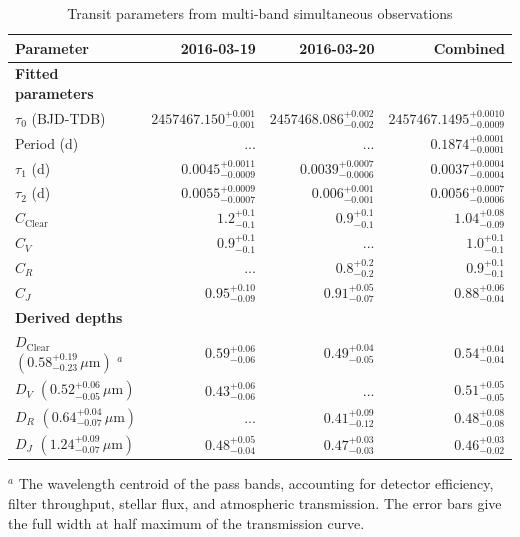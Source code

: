 \documentclass[useAMS,usenatbib]{mn2e}
\begin{document}
\begin{table}
\centering
\caption{\label{tab:simultaneous_params}Transit parameters from multi-band simultaneous observations}
\begin{tabular}{lrrr}
\hline\hline
Parameter & 2016-03-19 & 2016-03-20 & Combined\\
\hline
\textbf{Fitted parameters} & & & \\
$\tau_0$ (BJD-TDB) & $2457467.150_{-0.001}^{+0.001}$ & $2457468.086_{-0.002}^{+0.002}$ & $2457467.1495_{-0.0009}^{+0.0010}$\\
Period (d) & ... & ... & $0.1874_{-0.0001}^{+0.0001}$ \\ 
$\tau_1$ (d) & $0.0045_{-0.0009}^{+0.0011}$ & $0.0039_{-0.0006}^{+0.0007}$ & $0.0037_{-0.0004}^{+0.0004}$ \\
$\tau_2$ (d) & $0.0055_{-0.0007}^{+0.0009}$ & $0.006_{-0.001}^{+0.001}$ & $0.0056_{-0.0006}^{+0.0007}$ \\
$C_\mathrm{Clear}$ & $1.2_{-0.1}^{+0.1}$ & $0.9_{-0.1}^{+0.1}$ & $1.04_{-0.09}^{+0.08}$ \\
$C_V$ & $0.9_{-0.1}^{+0.1}$ & ... & $1.0_{-0.1}^{+0.1}$\\
$C_R$ & ... & $0.8_{-0.2}^{+0.2}$ & $0.9_{-0.1}^{+0.1}$ \\
$C_J$ & $0.95_{-0.09}^{+0.10}$ & $0.91_{-0.07}^{+0.05}$ & $0.88_{-0.04}^{+0.06}$ \\
\textbf{Derived depths} && \\
$D_\mathrm{Clear}$ $(0.58_{-0.23}^{+0.19}\,\mu\mathrm{m})$ $^a$ & $0.59_{-0.06}^{+0.06}$ & $0.49_{-0.05}^{+0.04}$ & $0.54_{-0.04}^{+0.04}$ \\
$D_V$ $(0.52_{-0.05}^{+0.06}\,\mu\mathrm{m})$& $0.43_{-0.06}^{+0.06}$  & ... & $0.51_{-0.05}^{+0.05}$\\
$D_R$ $(0.64_{-0.07}^{+0.04}\,\mu\mathrm{m})$& ... & $0.41_{-0.12}^{+0.09}$ & $0.48_{-0.08}^{+0.08}$\\
$D_J$ $(1.24_{-0.07}^{+0.09}\,\mu\mathrm{m})$ & $0.48_{-0.04}^{+0.05}$ & $0.47_{-0.03}^{+0.03}$ & $0.46_{-0.02}^{+0.03}$\\
\hline
\end{tabular}
    \begin{flushleft}
    $^a$ The wavelength centroid of the pass bands, accounting for detector efficiency, filter throughput, stellar flux, and atmospheric transmission. The error bars give the full width at half maximum of the transmission curve.\\
    \end{flushleft}
\end{table}
\end{document}
